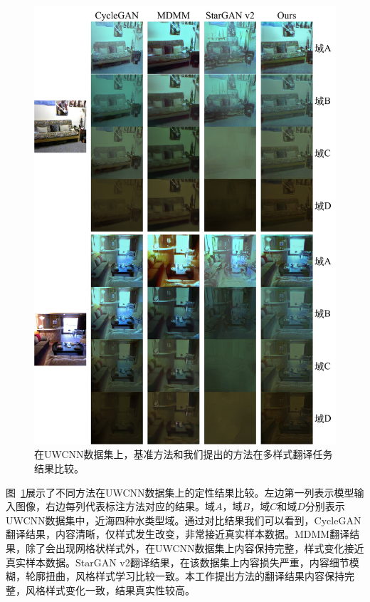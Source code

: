 \begin{figure}
    \centering
  \includegraphics[width=\textwidth]{figures/comparison_domain_uwcnn.pdf}
  \caption{在UWCNN数据集上，基准方法和我们提出的方法在多样式翻译任务结果比较。}
  \label{fig:comparison_domain_uwcnn}
\end{figure}

图~\ref{fig:comparison_domain_uwcnn}展示了不同方法在UWCNN数据集上的定性结果比较。左边第一列表示模型输入图像，右边每列代表标注方法对应的结果。域$A$，域$B$，域$C$和域$D$分别表示UWCNN数据集中，近海四种水类型域。通过对比结果我们可以看到，CycleGAN翻译结果，内容清晰，仅样式发生改变，非常接近真实样本数据。MDMM翻译结果，除了会出现网格状样式外，在UWCNN数据集上内容保持完整，样式变化接近真实样本数据。StarGAN v2翻译结果，在该数据集上内容损失严重，内容细节模糊，轮廓扭曲，风格样式学习比较一致。本工作提出方法的翻译结果内容保持完整，风格样式变化一致，结果真实性较高。


